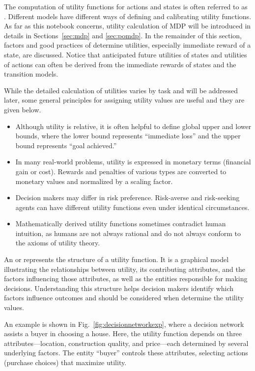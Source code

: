 The computation of utility functions for actions and states is often referred to as . Different models have different ways of defining and calibrating utility functions. As far as this notebook concerns, utility calculation of MDP will be introduced in details in Sections~\ref{sec:mdp} and \ref{sec:pomdp}. In the remainder of this section, factors and good practices of determine utilities, especially immediate reward of a state, are discussed. Notice that anticipated future utilities of states and utilities of actions can often be derived from the immediate rewards of states and the transition models.

While the detailed calculation of utilities varies by task and will be addressed later, some general principles for assigning utility values are useful and they are given below.
\begin{itemize}
	\item Although utility is relative, it is often helpful to define global upper and lower bounds, where the lower bound represents “immediate loss” and the upper bound represents “goal achieved.”
	\item In many real-world problems, utility is expressed in monetary terms (financial gain or cost). Rewards and penalties of various types are converted to monetary values and normalized by a scaling factor.
	\item Decision makers may differ in risk preference. Risk-averse and risk-seeking agents can have different utility functions even under identical circumstances.
	\item Mathematically derived utility functions sometimes contradict human intuition, as humans are not always rational and do not always conform to the axioms of utility theory.
\end{itemize}

An  or  represents the structure of a utility function. It is a graphical model illustrating the relationships between utility, its contributing attributes, and the factors influencing those attributes, as well as the entities responsible for making decisions. Understanding this structure helps decision makers identify which factors influence outcomes and should be considered when determine the utility values.

An example is shown in Fig.~\ref{fig:decisionnetworkexp}, where a decision network assists a buyer in choosing a house. Here, the utility function depends on three attributes—location, construction quality, and price—each determined by several underlying factors. The entity ``buyer'' controls these attributes, selecting actions (purchase choices) that maximize utility.

